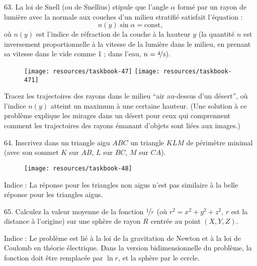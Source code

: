 \begin{problem}{63.}
    La loi de Snell (ou de Snellius) stipule que l’angle $\alpha$ formé par un rayon de lumière avec la normale aux couches d’un milieu stratifié satisfait l’équation :
    \begin{equation*}
        n(y) \sin \alpha=\text{const},
    \end{equation*}
    où $n(y)$ est l’indice de réfraction de la couche à la hauteur $y$ (la quantité $n$ est inversement proportionnelle à la vitesse de la lumière dans le milieu, en prenant sa vitesse dans le vide comme 1 ; dans l’eau, $n=\nicefrac{4}{3}$).
    \begin{figure}
        \null\hfill
        \texttt{[image: resources/taskbook-47]}
        \hfill
        \texttt{[image: resources/taskbook-471]}
        \hfill\null
    \end{figure}

    Tracez les trajectoires des rayons dans le milieu \enquote{air au-dessus d’un désert}, où l’indice $n(y)$ atteint un maximum
    à une certaine hauteur.
    (Une solution à ce problème explique les mirages dans un désert pour ceux qui comprennent comment les trajectoires des rayons émanant d’objets sont liées aux images.)
\end{problem}

\begin{problem}{64.}
    Inscrivez dans un triangle aigu $ABC$ un triangle $KLM$ de périmètre minimal
    (avec son sommet $K$ sur $AB$, $L$ sur $BC$, $M$ sur $CA$).
    \begin{figure}
        \texttt{[image: resources/taskbook-48]}
    \end{figure}

    \begin{note}{Indice :}
        La réponse pour les triangles non aigus n’est pas similaire à la belle réponse pour les triangles aigus.
    \end{note}
\end{problem}

\begin{problem}{65.}
    Calculez la valeur moyenne de la fonction $\nicefrac{1}{r}$ (où
    $r^2=x^2+y^2+z^2$, $r$ est la distance à l’origine) sur une sphère de rayon
    $R$ centrée au point $(X,Y,Z)$.

    \begin{note}{Indice :}
        Le problème est lié à la loi de la gravitation de Newton et à la loi de Coulomb en théorie électrique.
        Dans la version bidimensionnelle du problème, la fonction doit être remplacée par $\ln r$, et la sphère par le cercle.
    \end{note}
\end{problem}

